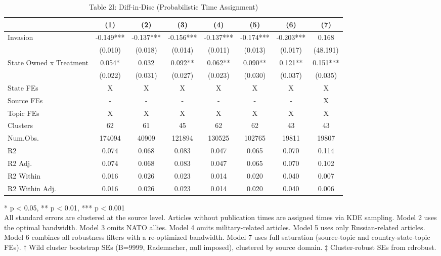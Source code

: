 \begin{table}[t]
\caption{\label{tab:table2i}Table 2I: Diff-in-Disc (Probabilistic Time Assignment)} 
\fontsize{12.0pt}{14.0pt}\selectfont
\begin{tabular*}{\linewidth}{@{\extracolsep{\fill}}lccccccc}
\toprule
  & (1) & (2) & (3) & (4) & (5) & (6) & (7) \\ 
\midrule\addlinespace[2.5pt]
Invasion & -0.149*** & -0.137*** & -0.156*** & -0.137*** & -0.174*** & -0.203*** & 0.168 \\ 
 & (0.010) & (0.018) & (0.014) & (0.011) & (0.013) & (0.017) & (48.191) \\ 
State Owned x Treatment & 0.054* & 0.032 & 0.092** & 0.062** & 0.090** & 0.121** & 0.151*** \\ 
{} & {(0.022)} & {(0.031)} & {(0.027)} & {(0.023)} & {(0.030)} & {(0.037)} & {(0.035)} \\ 
State FEs & X & X & X & X & X & X & X \\ 
Source FEs & - & - & - & - & - & - & X \\ 
Topic FEs & X & X & X & X & X & X & X \\ 
Clusters & 62 & 61 & 45 & 62 & 62 & 43 & 43 \\ 
Num.Obs. & 174094 & 40909 & 121894 & 130525 & 102765 & 19811 & 19807 \\ 
R2 & 0.074 & 0.068 & 0.083 & 0.047 & 0.065 & 0.070 & 0.114 \\ 
R2 Adj. & 0.074 & 0.068 & 0.083 & 0.047 & 0.065 & 0.070 & 0.102 \\ 
R2 Within & 0.016 & 0.026 & 0.023 & 0.014 & 0.020 & 0.040 & 0.007 \\ 
R2 Within Adj. & 0.016 & 0.026 & 0.023 & 0.014 & 0.020 & 0.040 & 0.006 \\ 
\bottomrule
\end{tabular*}
\begin{minipage}{\linewidth}
\vspace{.05em}
* p < 0.05, ** p < 0.01, *** p < 0.001\\
All standard errors are clustered at the source level. Articles without
publication times are assigned times via KDE sampling. Model 2 uses the
optimal bandwidth. Model 3 omits NATO allies. Model 4 omits military-related
articles. Model 5 uses only Russian-related articles. Model 6 combines all
robustness filters with a re-optimized bandwidth. Model 7 uses full saturation
(source-topic and country-state-topic FEs). † Wild cluster bootstrap SEs
(B=9999, Rademacher, null imposed), clustered by source domain. ‡ Cluster-robust
SEs from rdrobust.\\
\end{minipage}
\end{table}

